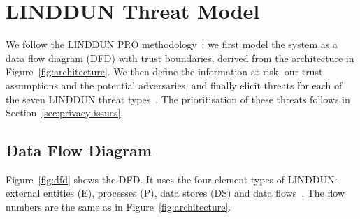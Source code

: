 \documentclass[a4paper,12pt]{article}
\begin{document}
\section{LINDDUN Threat Model}
\label{sec:threat-model}

We follow the LINDDUN PRO methodology~\cite{linddun-pro}: we first model the system as a data
flow diagram (DFD) with trust boundaries, derived from the architecture in
Figure~\ref{fig:architecture}. We then define the information at risk, our trust assumptions
and the potential adversaries, and finally elicit threats for each of the seven LINDDUN threat
types~\cite{linddun-types,deng2011}. The prioritisation of these threats follows in
Section~\ref{sec:privacy-issues}.

\subsection{Data Flow Diagram}
Figure~\ref{fig:dfd} shows the DFD. It uses the four element types of LINDDUN: external
entities (E), processes (P), data stores (DS) and data flows~\cite{linddun-pro}. The flow numbers
are the same as in Figure~\ref{fig:architecture}.
\end{document}

